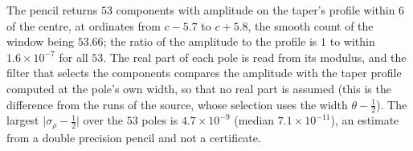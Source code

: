 \begin{resultpar}\label{es:res:pencil1e13}The pencil returns $53$ components with amplitude on the taper's profile within $6$ of the centre, at ordinates from $c-5.7$ to $c+5.8$, the smooth count of the window being $53.66$; the ratio of the amplitude to the profile is $1$ to within $1.6\times10^{-7}$ for all $53$. The real part of each pole is read from its modulus, and the filter that selects the components compares the amplitude with the taper profile computed at the pole's own width, so that no real part is assumed (this is the difference from the runs of the source, whose selection uses the width $\theta-\tfrac12$). The largest $\lvert\sigma_\rho-\tfrac12\rvert$ over the $53$ poles is $4.7\times10^{-9}$ (median $7.1\times10^{-11}$), an estimate from a double precision pencil and not a certificate.\end{resultpar}

